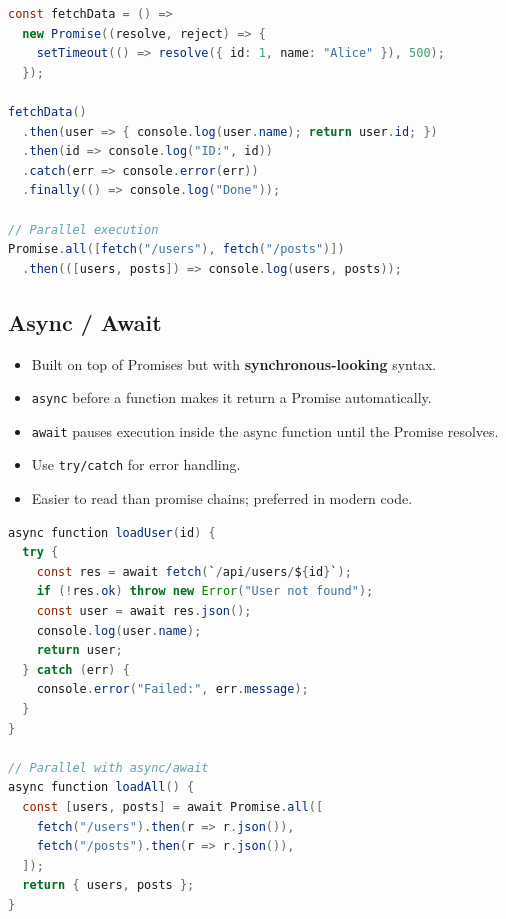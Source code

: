 \documentclass[hidelinks]{article}
\begin{document}
\begin{lstlisting}[language=Java, caption={Promises}]
const fetchData = () =>
  new Promise((resolve, reject) => {
    setTimeout(() => resolve({ id: 1, name: "Alice" }), 500);
  });

fetchData()
  .then(user => { console.log(user.name); return user.id; })
  .then(id => console.log("ID:", id))
  .catch(err => console.error(err))
  .finally(() => console.log("Done"));

// Parallel execution
Promise.all([fetch("/users"), fetch("/posts")])
  .then(([users, posts]) => console.log(users, posts));
\end{lstlisting}

\subsection{Async / Await}
\begin{itemize}
  \item Built on top of Promises but with \textbf{synchronous-looking} syntax.
  \item \texttt{async} before a function makes it return a Promise automatically.
  \item \texttt{await} pauses execution inside the async function until the Promise resolves.
  \item Use \texttt{try/catch} for error handling.
  \item Easier to read than promise chains; preferred in modern code.
\end{itemize}

\begin{lstlisting}[language=Java, caption={async/await}]
async function loadUser(id) {
  try {
    const res = await fetch(`/api/users/${id}`);
    if (!res.ok) throw new Error("User not found");
    const user = await res.json();
    console.log(user.name);
    return user;
  } catch (err) {
    console.error("Failed:", err.message);
  }
}

// Parallel with async/await
async function loadAll() {
  const [users, posts] = await Promise.all([
    fetch("/users").then(r => r.json()),
    fetch("/posts").then(r => r.json()),
  ]);
  return { users, posts };
}
\end{lstlisting}
\end{document}
